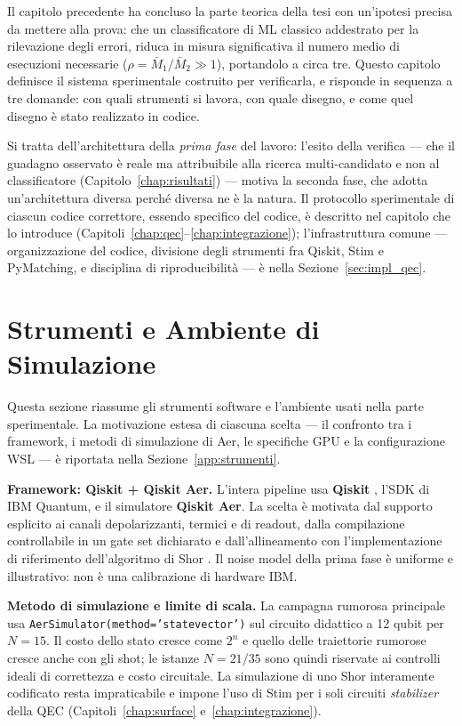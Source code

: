 \begin{onehalfspace}

Il capitolo precedente ha concluso la parte teorica della tesi con un'ipotesi precisa da
mettere alla prova: che un classificatore di \ac{ML} classico addestrato per
la rilevazione degli errori, riduca in misura significativa il numero medio di esecuzioni
necessarie ($\rho = \bar{M}_1/\bar{M}_2 \gg 1$), portandolo a circa tre. Questo capitolo
definisce il sistema sperimentale costruito per verificarla, e risponde in sequenza a tre
domande: con quali strumenti si lavora, con quale disegno, e come quel disegno è stato
realizzato in codice.

Si tratta dell'architettura della \emph{prima fase} del lavoro: l'esito della verifica ---
che il guadagno osservato è reale ma attribuibile alla ricerca multi-candidato e non al
classificatore (Capitolo~\ref{chap:risultati}) --- motiva la seconda fase, che adotta
un'architettura diversa perché diversa ne è la natura. Il protocollo sperimentale di ciascun
codice correttore, essendo specifico del codice, è descritto nel capitolo che lo introduce
(Capitoli~\ref{chap:qec}--\ref{chap:integrazione}); l'infrastruttura comune --- organizzazione
del codice, divisione degli strumenti fra Qiskit, Stim e PyMatching, e disciplina di
riproducibilità --- è nella Sezione~\ref{sec:impl_qec}.

\section{Strumenti e Ambiente di Simulazione}
\label{chap:strumenti}

Questa sezione riassume gli strumenti software e l'ambiente usati nella parte sperimentale.
La motivazione estesa di ciascuna scelta --- il confronto tra i framework, i metodi di
simulazione di Aer, le specifiche GPU e la configurazione WSL --- è riportata nella
Sezione~\ref{app:strumenti}.

\textbf{Framework: Qiskit + Qiskit Aer.} L'intera pipeline usa \textbf{Qiskit} \cite{qiskit2023}, l'SDK di IBM Quantum, e il simulatore \textbf{Qiskit Aer}. La scelta è motivata dal supporto esplicito ai canali depolarizzanti, termici e di readout, dalla compilazione controllabile in un gate set dichiarato e dall'allineamento con l'implementazione di riferimento dell'algoritmo di Shor \cite{skosana2021, github_shor}. Il noise model della prima fase è uniforme e illustrativo: non è una calibrazione di hardware IBM.

\textbf{Metodo di simulazione e limite di scala.} La campagna rumorosa principale usa \texttt{AerSimulator(method='statevector')} sul circuito didattico a 12 qubit per $N=15$. Il costo dello stato cresce come $2^n$ e quello delle traiettorie rumorose cresce anche con gli shot; le istanze $N=21/35$ sono quindi riservate ai controlli ideali di correttezza e costo circuitale. La simulazione di uno Shor interamente codificato resta impraticabile e impone l'uso di Stim per i soli circuiti \emph{stabilizer} della QEC (Capitoli~\ref{chap:surface} e~\ref{chap:integrazione}).


\end{onehalfspace}
